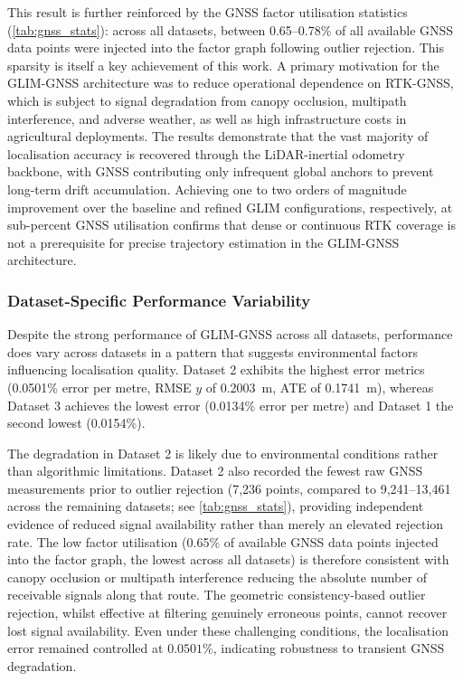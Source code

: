 This result is further reinforced by the GNSS factor utilisation statistics (\cref{tab:gnss_stats}): across all datasets, between 0.65--0.78\% of all available GNSS data points were injected into the factor graph following outlier rejection. This sparsity is itself a key achievement of this work. A primary motivation for the GLIM-GNSS architecture was to reduce operational dependence on RTK-GNSS, which is subject to signal degradation from canopy occlusion, multipath interference, and adverse weather, as well as high infrastructure costs in agricultural deployments. The results demonstrate that the vast majority of localisation accuracy is recovered through the LiDAR-inertial odometry backbone, with GNSS contributing only infrequent global anchors to prevent long-term drift accumulation. Achieving one to two orders of magnitude improvement over the baseline and refined GLIM configurations, respectively, at sub-percent GNSS utilisation confirms that dense or continuous RTK coverage is not a prerequisite for precise trajectory estimation in the GLIM-GNSS architecture.

\subsubsection{Dataset-Specific Performance Variability}

Despite the strong performance of GLIM-GNSS across all datasets, performance does vary across datasets in a pattern that suggests environmental factors influencing localisation quality. Dataset 2 exhibits the highest error metrics (0.0501\% error per metre, RMSE $y$ of 0.2003~m, ATE of 0.1741~m), whereas Dataset 3 achieves the lowest error (0.0134\% error per metre) and Dataset 1 the second lowest (0.0154\%). 

The degradation in Dataset 2 is likely due to environmental conditions rather than algorithmic limitations. Dataset 2 also recorded the fewest raw GNSS measurements prior to outlier rejection (7,236 points, compared to 9,241--13,461 across the remaining datasets; see \cref{tab:gnss_stats}), providing independent evidence of reduced signal availability rather than merely an elevated rejection rate. The low factor utilisation (0.65\% of available GNSS data points injected into the factor graph, the lowest across all datasets) is therefore consistent with canopy occlusion or multipath interference reducing the absolute number of receivable signals along that route. The geometric consistency-based outlier rejection, whilst effective at filtering genuinely erroneous points, cannot recover lost signal availability. Even under these challenging conditions, the localisation error remained controlled at $0.0501\%$, indicating robustness to transient GNSS degradation.

